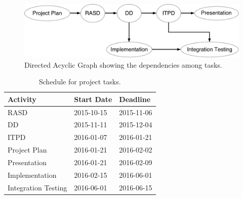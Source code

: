 \begin{figure}
    \centering
    \includegraphics[width=\textwidth]{figures/TasksDAG.pdf}
    \caption{Directed Acyclic Graph showing the dependencies among tasks.}
    \label{fig:tasks-dag}
\end{figure}

\begin{table}[p]
    \centering
    \begin{tabular}{| l | l | l |}
        \hline
        \textbf{Activity}   & \textbf{Start Date}   & \textbf{Deadline} \\
        \hline
        RASD                & 2015-10-15            & 2015-11-06        \\
        DD                  & 2015-11-11            & 2015-12-04        \\
        ITPD                & 2016-01-07            & 2016-01-21        \\
        Project Plan        & 2016-01-21            & 2016-02-02        \\
        Presentation        & 2016-01-21            & 2016-02-09        \\
        Implementation      & 2016-02-15            & 2016-06-01        \\
        Integration Testing & 2016-06-01            & 2016-06-15        \\
        \hline
    \end{tabular}
    \caption{Schedule for project tasks.}
    \label{tab:schedule}
\end{table}

